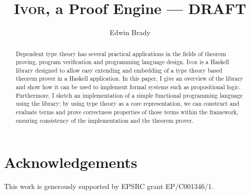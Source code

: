 \documentclass[orivec,dvips,10pt]{llncs}
\newcommand{\Ivor}{\textsc{Ivor}}
\begin{document}
\title{\Ivor{}, a Proof Engine --- DRAFT}
\author{Edwin Brady}

 
\maketitle

\begin{abstract}
Dependent type theory has several practical applications in the fields
of theorem proving, program verification and programming language
design. \Ivor{} is a Haskell library designed to allow easy extending
and embedding of a type theory based theorem prover in a Haskell
application. In this paper, I give an overview of the library and show
how it can be used to implement formal systems such as propositional
logic.  Furthermore, I sketch an implementation of a simple functional
programming language using the library; by using type theory as a core
representation, we can construct and evaluate terms and prove
correctness properties of those terms within the 
framework, ensuring consistency of the implementation and the theorem prover.

\end{abstract}





%







\section*{Acknowledgements}

This work is generously supported by EPSRC grant EP/C001346/1. 


\begin{small}


\appendix



\end{small}
\end{document}
